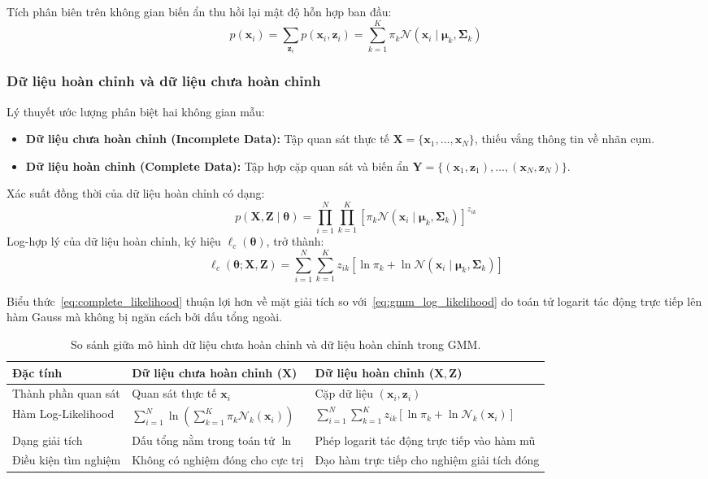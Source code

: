 \documentclass[12pt,a4paper]{article}
\newcommand{\vx}{\mathbf{x}}
\newcommand{\vz}{\mathbf{z}}
\newcommand{\vmu}{\boldsymbol{\mu}}
\newcommand{\vSigma}{\boldsymbol{\Sigma}}
\newcommand{\vtheta}{\boldsymbol{\theta}}
\newcommand{\bX}{\mathbf{X}}
\newcommand{\bY}{\mathbf{Y}}
\newcommand{\bZ}{\mathbf{Z}}
\newcommand{\Normal}{\mathcal{N}}
\begin{document}
Tích phân biên trên không gian biến ẩn thu hồi lại mật độ hỗn hợp ban đầu:
\begin{equation}
    p(\vx_i) = \sum_{\vz_i} p(\vx_i, \vz_i) = \sum_{k=1}^K \pi_k \Normal(\vx_i \mid \vmu_k, \vSigma_k)
\end{equation}

\subsubsection{Dữ liệu hoàn chỉnh và dữ liệu chưa hoàn chỉnh}

Lý thuyết ước lượng phân biệt hai không gian mẫu:
\begin{itemize}
    \item \textbf{Dữ liệu chưa hoàn chỉnh (Incomplete Data):} Tập quan sát thực tế $\bX = \{\vx_1, \dots, \vx_N\}$, thiếu vắng thông tin về nhãn cụm.
    \item \textbf{Dữ liệu hoàn chỉnh (Complete Data):} Tập hợp cặp quan sát và biến ẩn $\bY = \{(\vx_1, \vz_1), \dots, (\vx_N, \vz_N)\}$.
\end{itemize}

Xác suất đồng thời của dữ liệu hoàn chỉnh có dạng:
\begin{equation}
    p(\bX, \bZ \mid \vtheta) = \prod_{i=1}^N \prod_{k=1}^K \left[ \pi_k \Normal(\vx_i \mid \vmu_k, \vSigma_k) \right]^{z_{ik}}
\end{equation}
Log-hợp lý của dữ liệu hoàn chỉnh, ký hiệu $\ell_c(\vtheta)$, trở thành:
\begin{equation}
    \ell_c(\vtheta ; \bX, \bZ) = \sum_{i=1}^N \sum_{k=1}^K z_{ik} \left[ \ln \pi_k + \ln \Normal(\vx_i \mid \vmu_k, \vSigma_k) \right] \label{eq:complete_likelihood}
\end{equation}

Biểu thức~\eqref{eq:complete_likelihood} thuận lợi hơn về mặt giải tích so với~\eqref{eq:gmm_log_likelihood} do toán tử logarit tác động trực tiếp lên hàm Gauss mà không bị ngăn cách bởi dấu tổng ngoài.

\begin{table}[htbp]
\centering
\small
\renewcommand{\arraystretch}{1.3}
\caption{So sánh giữa mô hình dữ liệu chưa hoàn chỉnh và dữ liệu hoàn chỉnh trong GMM.}
\label{tab:complete_incomplete}
\begin{tabularx}{\textwidth}{p{3.5cm}XX}
\toprule
\textbf{Đặc tính} & \textbf{Dữ liệu chưa hoàn chỉnh ($\bX$)} & \textbf{Dữ liệu hoàn chỉnh ($\bX, \bZ$)} \\
\midrule
Thành phần quan sát & Quan sát thực tế $\vx_i$ & Cặp dữ liệu $(\vx_i, \vz_i)$ \\
Hàm Log-Likelihood & $\sum\limits_{i=1}^N \ln \left( \sum\limits_{k=1}^K \pi_k \Normal_k(\vx_i) \right)$ & $\sum\limits_{i=1}^N \sum\limits_{k=1}^K z_{ik} \left[ \ln \pi_k + \ln \Normal_k(\vx_i) \right]$ \\
Dạng giải tích & Dấu tổng nằm trong toán tử $\ln$ & Phép logarit tác động trực tiếp vào hàm mũ \\
Điều kiện tìm nghiệm & Không có nghiệm đóng cho cực trị & Đạo hàm trực tiếp cho nghiệm giải tích đóng \\
\bottomrule
\end{tabularx}
\end{table}
\end{document}
